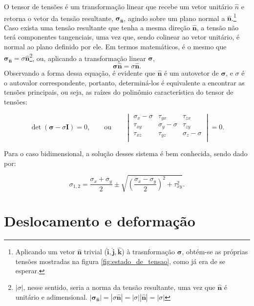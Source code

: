 O tensor de tensões é um transformação linear que recebe um vetor unitário $\hat{n}$ e retorna o vetor da tensão resultante, $\bm{\sigma}_{\bm{\hat{n}}}$, agindo sobre um plano normal a $\bm{\hat{n}}$.\footnote{Aplicando um vetor $\bm{\hat{n}}$ trivial ($\bm{\hat{i}}, \bm{\hat{j}}, \bm{\hat{k}}$) à trasnformação $\bm{\sigma}$, obtém-se as próprias tensões mostradas na figura \ref{fig:estado_de_tensao}, como já era de se esperar.} Caso exista uma tensão resultante que tenha a mesma direção $\bm{\hat{n}}$, a tensão não terá componentes tangenciais, uma vez que, sendo colinear ao vetor unitário, é normal ao plano definido por ele. Em termos matemáticos, é o mesmo que $\bm{\sigma}_{\bm{\hat{n}}} = \sigma \bm{\hat{n}}$\footnote{$|\sigma|$, nesse sentido, seria a norma da tensão resultante, uma vez que $\bm{\hat{n}}$ é unitário e adimensional. $ |\bm{\sigma}_{\bm{\hat{n}}}| = |\sigma \bm{\hat{n}}| = |\sigma| |\bm{\hat{n}}| = |\sigma| $}, ou, aplicando a transformação linear $\bm{\sigma}$,
\begin{equation}
    \bm{\sigma}\bm{\hat{n}} = \sigma \bm{\hat{n}}.
\end{equation}
Observando a forma dessa equação, é evidente que $\bm{\hat{n}}$ é um autovetor de $\bm{\sigma}$, e $\sigma$ é o autovalor correspondente, portanto, determiná-los é equivalente a encontrar as tensões principais, ou seja, as raízes do polinômio característica do tensor de tensões:

\begin{equation}
    \det{(\bm{\sigma} - \sigma \bm{I})} = 0, \qquad \text{ou} \qquad \begin{vmatrix}
        \sigma_x - \sigma & \tau_{yx} & \tau_{zx} \\
        \tau_{xy} & \sigma_{y} - \sigma & \tau_{zy} \\
        \tau_{xz} & \tau_{yz} & \sigma_{z} - \sigma \\
    \end{vmatrix} = 0.
\end{equation}

Para o caso bidimensional, a solução desses sistema é bem conhecida, sendo dado por:

\begin{equation}
    \sigma_{1,2} = \frac{\sigma_x + \sigma_y}{2} \pm \sqrt{\left(\frac{\sigma_x - \sigma_y}{2}\right)^2 + \tau_{xy}^2}.
\end{equation}

\section{Deslocamento e deformação}

